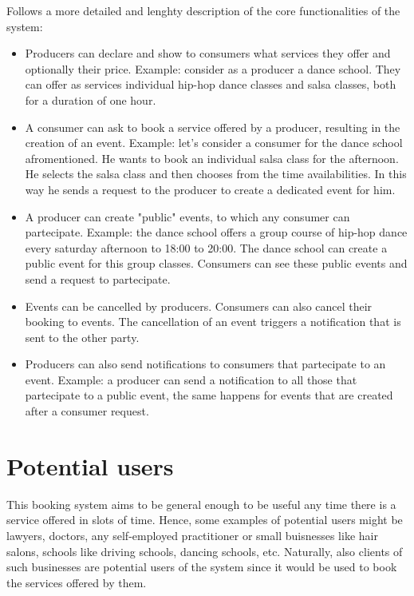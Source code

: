 \documentclass{article}
\begin{document}
Follows a more detailed and lenghty description of the core functionalities
of the system:

\begin{itemize}

	\item Producers can declare and show to consumers what services they
		offer and optionally their price. Example: consider as a
		producer a dance school. They
		can offer as services individual hip-hop dance classes and salsa
		classes, both for a duration of one hour.

	\item A consumer can ask to book a service offered by a producer,
		resulting in the creation of an event. Example: let's consider
		a consumer for the dance school afromentioned. He wants to book
		an individual salsa class for the afternoon. He selects the
		salsa class and then chooses from the time availabilities. In
		this way he sends a request to the producer to create a
		dedicated event for him.

	\item A producer can create "public" events, to which any consumer can
		partecipate. Example: the dance school offers a group course of
		hip-hop dance every saturday afternoon to 18:00 to 20:00. The
		dance school can create a public event for this group classes.
		Consumers can see these public events and send a request to
		partecipate.

	\item Events can be cancelled by producers. Consumers can also cancel
		their booking to events. The cancellation of an event triggers
		a notification that is sent to the other party.

	\item Producers can also send notifications to consumers that
		partecipate to an event. Example: a producer can send a
		notification to all those that partecipate to a public event,
		the same happens for events that are created after a consumer
		request.
\end{itemize}

\section{Potential users}
This booking system aims to be general enough to be
useful any time there is a service offered in slots of time. Hence, some
examples of potential users might be lawyers, doctors, any self-employed
practitioner or small buisnesses like hair salons, schools like driving
schools, dancing schools, etc. Naturally, also clients of such businesses are
potential users of the system since it would be used to book the services
offered by them.
\end{document}
